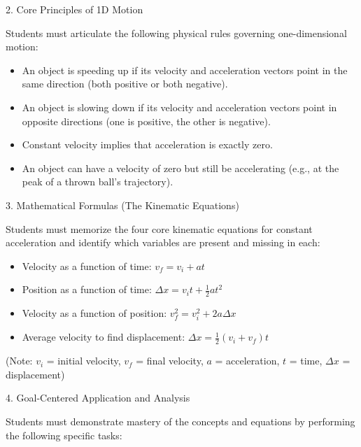 \documentclass[]{article}
\begin{document}
2. Core Principles of 1D Motion

Students must articulate the following physical rules governing one-dimensional motion:

\begin{itemize}[itemsep=0pt,topsep=0pt]
    \item An object is speeding up if its velocity and acceleration vectors point in the same direction (both positive or both negative).
    \item An object is slowing down if its velocity and acceleration vectors point in opposite directions (one is positive, the other is negative).
    \item Constant velocity implies that acceleration is exactly zero.
    \item An object can have a velocity of zero but still be accelerating (e.g., at the peak of a thrown ball's trajectory).
\end{itemize}



3. Mathematical Formulas (The Kinematic Equations)

Students must memorize the four core kinematic equations for constant acceleration and identify which variables are present and missing in each:


\begin{itemize}[itemsep=0pt,topsep=0pt]
    \item  Velocity as a function of time: $v_f = v_i + at$
    \item Position as a function of time: $\Delta x = v_i t + \frac{1}{2}at^2$
    \item Velocity as a function of position: $v_f^2 = v_i^2 + 2a\Delta x$
    \item Average velocity to find displacement: $\Delta x = \frac{1}{2}(v_i + v_f)t$
\end{itemize}


(Note: $v_i$ = initial velocity, $v_f$ = final velocity, $a$ = acceleration, $t$ = time, $\Delta x$ = displacement)

4. Goal-Centered Application and Analysis

Students must demonstrate mastery of the concepts and equations by performing the following specific tasks:
\end{document}
